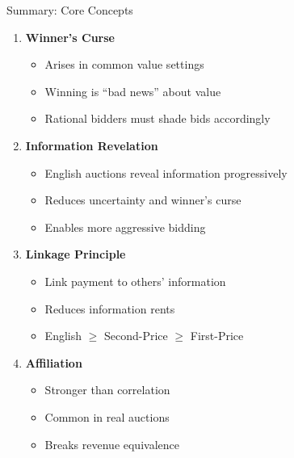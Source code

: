 \documentclass[xcolor={x11names}]{beamer}
\begin{document}
\begin{frame}{Summary: Core Concepts}
\begin{enumerate}
  \item \textbf{Winner's Curse}
  \begin{itemize}
    \item Arises in common value settings
    \item Winning is ``bad news'' about value
    \item Rational bidders must shade bids accordingly
  \end{itemize}
  
  \item \textbf{Information Revelation}
  \begin{itemize}
    \item English auctions reveal information progressively
    \item Reduces uncertainty and winner's curse
    \item Enables more aggressive bidding
  \end{itemize}
  
  \item \textbf{Linkage Principle}
  \begin{itemize}
    \item Link payment to others' information
    \item Reduces information rents
    \item English $\geq$ Second-Price $\geq$ First-Price
  \end{itemize}
  
  \item \textbf{Affiliation}
  \begin{itemize}
    \item Stronger than correlation
    \item Common in real auctions
    \item Breaks revenue equivalence
  \end{itemize}
\end{enumerate}
\end{frame}
\end{document}
